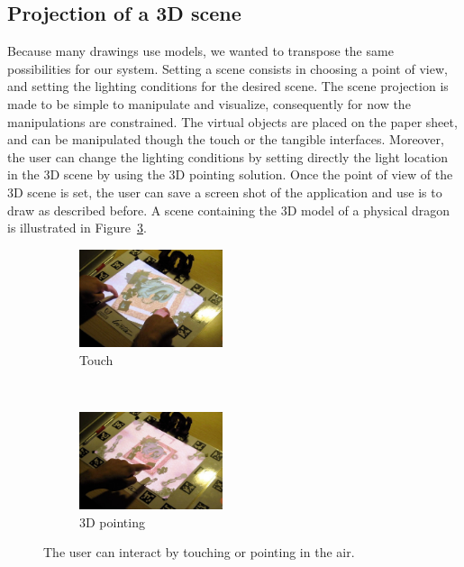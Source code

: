 \documentclass{article}
\begin{document}
\subsection{Projection of a 3D scene}
Because many drawings use models, we wanted to transpose the same possibilities for our system. 
Setting a scene consists in choosing a point of view, and setting the lighting conditions for the desired scene.
The scene projection is made to be simple to manipulate and visualize, consequently for now the manipulations are constrained. 
The virtual objects are placed on the paper sheet, and can be manipulated though the touch or the tangible interfaces. Moreover, the user can change the lighting conditions by setting directly the light location in the 3D scene by using the 3D pointing solution. Once the point of view of the 3D scene is set, the user can save a screen shot of the application and use is to draw as described before. A scene containing the 3D model of a physical dragon is illustrated in Figure~\ref{fig:inter}.


\begin{figure}[!h]
        \begin{subfigure}[b]{4.2cm}
                \centering
                \includegraphics[width=4.2cm]{Still2}
                \caption{Touch}
                \label{fig:touch}
        \end{subfigure}%
        ~ %
        \begin{subfigure}[b]{0.25\textwidth}
                \centering
                \includegraphics[width=4.2cm]{Still1}
                \caption{3D pointing}
                \label{fig:point}
        \end{subfigure}
        \caption{The user can interact by touching or pointing in the air.}
        \label{fig:inter}
\end{figure}
\end{document}
